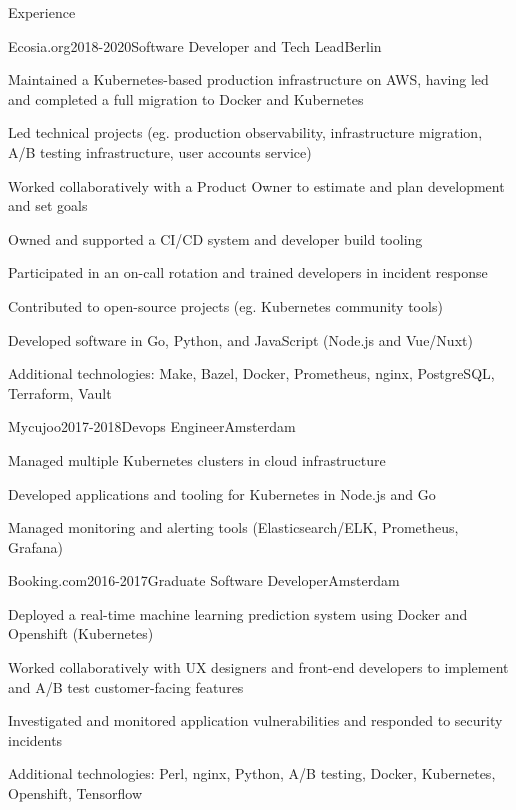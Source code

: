 \documentclass{resume} %
\begin{document}
\begin{rSection}{Experience}
\begin{rSubsection}{{Ecosia.org}}{2018-2020}{Software Developer and Tech Lead}{Berlin}
    \item Maintained a Kubernetes-based production infrastructure on AWS, having led and completed a full migration to Docker and Kubernetes
    \item Led technical projects (eg. production observability, infrastructure migration, A/B testing infrastructure, user accounts service)
    \item Worked collaboratively with a Product Owner to estimate and plan development and set goals
    \item Owned and supported a CI/CD system and developer build tooling
    \item Participated in an on-call rotation and trained developers in incident response
    \item Contributed to open-source projects (eg. Kubernetes community tools)
    \item Developed software in Go, Python, and JavaScript (Node.js and Vue/Nuxt)
    \item Additional technologies: Make, Bazel, Docker, Prometheus, nginx, PostgreSQL, Terraform, Vault
\end{rSubsection}


\begin{rSubsection}{{Mycujoo}}{2017-2018}{Devops Engineer}{Amsterdam}
    \item Managed multiple Kubernetes clusters in cloud infrastructure
    \item Developed applications and tooling for Kubernetes in Node.js and Go
    \item Managed monitoring and alerting tools (Elasticsearch/ELK, Prometheus, Grafana)
\end{rSubsection}


\begin{rSubsection}{{Booking.com}}{2016-2017}{Graduate Software Developer}{Amsterdam}
    \item Deployed a real-time machine learning prediction system using Docker and Openshift (Kubernetes)
    \item Worked collaboratively with UX designers and front-end developers to implement and A/B test customer-facing features
    \item Investigated and monitored application vulnerabilities and responded to security incidents
    \item Additional technologies: Perl, nginx, Python, A/B testing, Docker, Kubernetes, Openshift, Tensorflow
\end{rSubsection}


\end{rSection}
\end{document}
